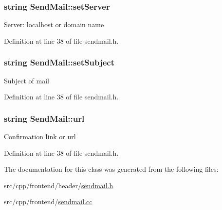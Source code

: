 \hypertarget{classSendMail_a5337895c22cda4db5ebd05e43925e391}{
\subsubsection[{set\-Server}]{\setlength{\rightskip}{0pt plus 5cm}string Send\-Mail\-::set\-Server\hspace{0.3cm}{\ttfamily [protected]}}}\label{classSendMail_a5337895c22cda4db5ebd05e43925e391}
Server\-: localhost or domain name 

Definition at line 38 of file sendmail.\-h.

\hypertarget{classSendMail_a22e32135e60ad02a6beff91638907cc6}{
\subsubsection[{set\-Subject}]{\setlength{\rightskip}{0pt plus 5cm}string Send\-Mail\-::set\-Subject\hspace{0.3cm}{\ttfamily [protected]}}}\label{classSendMail_a22e32135e60ad02a6beff91638907cc6}
Subject of mail 

Definition at line 38 of file sendmail.\-h.

\hypertarget{classSendMail_a6b02c708619c2fb35216b2ee3061f33b}{
\subsubsection[{url}]{\setlength{\rightskip}{0pt plus 5cm}string Send\-Mail\-::url\hspace{0.3cm}{\ttfamily [protected]}}}\label{classSendMail_a6b02c708619c2fb35216b2ee3061f33b}
Confirmation link or url 

Definition at line 38 of file sendmail.\-h.



The documentation for this class was generated from the following files\-:\begin{DoxyCompactItemize}
\item 
src/cpp/frontend/header/\hyperlink{sendmail_8h}{sendmail.\-h}\item 
src/cpp/frontend/\hyperlink{sendmail_8cc}{sendmail.\-cc}\end{DoxyCompactItemize}

